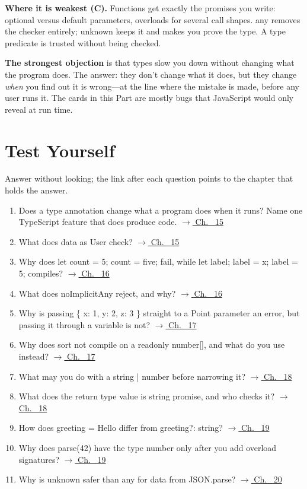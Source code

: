 \documentclass[10pt]{article}
\newcommand{\code}[1]{{\ttfamily\small #1}}
\begin{document}
\textbf{Where it is weakest (C).} Functions get exactly the promises you write: optional versus default parameters, overloads for several call shapes. \code{any} removes the checker entirely; \code{unknown} keeps it and makes you prove the type. A type predicate is trusted without being checked.

\textbf{The strongest objection} is that types slow you down without changing what the program does. The answer: they don't change what it does, but they change \emph{when} you find out it is wrong---at the line where the mistake is made, before any user runs it. The cards in this Part are mostly bugs that JavaScript would only reveal at run time.

\section*{Test Yourself}
Answer without looking; the link after each question points to the chapter that holds the answer.
\begin{enumerate}[leftmargin=1.6em,itemsep=3pt]
\item Does a type annotation change what a program does when it runs? Name one TypeScript feature that does produce code. \hfill{\small\hyperref[ch:c15]{$\rightarrow$ Ch.~ 15}}
\item What does \code{data as User} check? \hfill{\small\hyperref[ch:c15]{$\rightarrow$ Ch.~ 15}}
\item Why does \code{let count = 5; count = \textquotedbl{}five\textquotedbl{};} fail, while \code{let label; label = \textquotedbl{}x\textquotedbl{}; label = 5;} compiles? \hfill{\small\hyperref[ch:c16]{$\rightarrow$ Ch.~ 16}}
\item What does \code{noImplicitAny} reject, and why? \hfill{\small\hyperref[ch:c16]{$\rightarrow$ Ch.~ 16}}
\item Why is passing \code{\{ x: 1, y: 2, z: 3 \}} straight to a \code{Point} parameter an error, but passing it through a variable is not? \hfill{\small\hyperref[ch:c17]{$\rightarrow$ Ch.~ 17}}
\item Why does \code{sort} not compile on a \code{readonly number[]}, and what do you use instead? \hfill{\small\hyperref[ch:c17]{$\rightarrow$ Ch.~ 17}}
\item What may you do with a \code{string | number} before narrowing it? \hfill{\small\hyperref[ch:c18]{$\rightarrow$ Ch.~ 18}}
\item What does the return type \code{value is string} promise, and who checks it? \hfill{\small\hyperref[ch:c18]{$\rightarrow$ Ch.~ 18}}
\item How does \code{greeting = \textquotedbl{}Hello\textquotedbl{}} differ from \code{greeting?: string}? \hfill{\small\hyperref[ch:c19]{$\rightarrow$ Ch.~ 19}}
\item Why does \code{parse(\textquotedbl{}42\textquotedbl{})} have the type \code{number} only after you add overload signatures? \hfill{\small\hyperref[ch:c19]{$\rightarrow$ Ch.~ 19}}
\item Why is \code{unknown} safer than \code{any} for data from \code{JSON.parse}? \hfill{\small\hyperref[ch:c20]{$\rightarrow$ Ch.~ 20}}
\end{enumerate}
\end{document}
